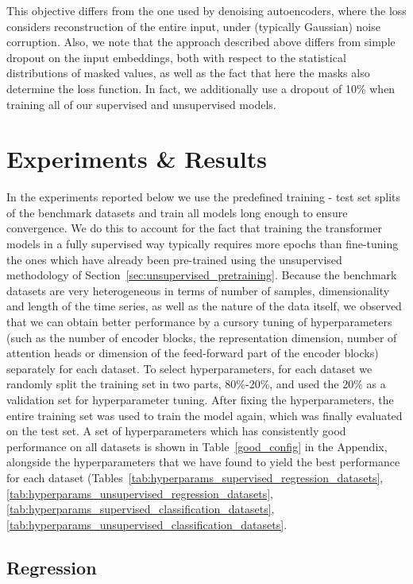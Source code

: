 \documentclass{article} \usepackage{iclr2021_conference,times}
\begin{document}
This objective differs from the one used by denoising autoencoders, where the loss considers reconstruction of the entire input, under (typically Gaussian) noise corruption. Also, we note that the approach described above differs from simple dropout on the input embeddings, both with respect to the statistical distributions of masked values, as well as the fact that here the masks also determine the loss function. In fact, we additionally use a dropout of 10\% when training all of our supervised and unsupervised models.


\section{Experiments \& Results}

In the experiments reported below we use the predefined training - test set splits of the benchmark datasets and train all models long enough to ensure convergence. We do this to account for the fact that training the transformer models in a fully supervised way typically requires more epochs than fine-tuning the ones which have already been pre-trained using the unsupervised methodology of Section~\ref{sec:unsupervised_pretraining}. Because the benchmark datasets are very heterogeneous in terms of number of samples, dimensionality and length of the time series, as well as the nature of the data itself, we observed that we can obtain better performance by a cursory tuning of hyperparameters (such as the number of encoder blocks, the representation dimension, number of attention heads or dimension of the feed-forward part of the encoder blocks) separately for each dataset. To select hyperparameters, for each dataset we randomly split the training set in two parts, 80\%-20\%, and used the 20\% as a validation set for hyperparameter tuning. After fixing the hyperparameters, the entire training set was used to train the model again, which was finally evaluated on the test set. A set of hyperparameters which has consistently good performance on all datasets is shown in Table~\ref{good_config} in the Appendix, alongside the hyperparameters that we have found to yield the best performance for each dataset (Tables~\ref{tab:hyperparams_supervised_regression_datasets}, \ref{tab:hyperparams_unsupervised_regression_datasets}, \ref{tab:hyperparams_supervised_classification_datasets}, \ref{tab:hyperparams_unsupervised_classification_datasets}. 

\subsection{Regression} \label{sec:regression}
\end{document}
